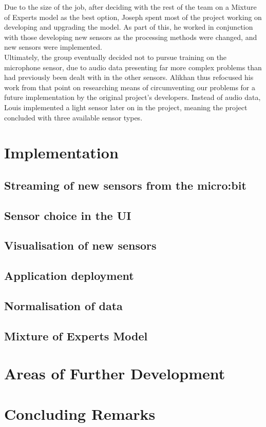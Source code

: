 \documentclass{article}
\begin{document}
Due to the size of the job, after deciding with the rest of the team on a Mixture of Experts model as the best option, Joseph spent most of the project working on developing and upgrading the model. As part of this, he worked in conjunction with those developing new sensors as the processing methods were changed, and new sensors were implemented. \\

Ultimately, the group eventually decided not to pursue training on the microphone sensor, due to audio data presenting far more complex problems than had previously been dealt with in the other sensors. Alikhan thus refocused his work from that point on researching means of circumventing our problems for a future implementation by the original project's developers. Instead of audio data, Louis implemented a light sensor later on in the project, meaning the project concluded with three available sensor types.

\section{Implementation}%
\label{sec:implementation}

\subsection{Streaming of new sensors from the micro:bit}%
\label{subsec:label}

\subsection{Sensor choice in the UI}%
\label{subsec:label}


\subsection{Visualisation of new sensors}%
\label{subsec:sensorvis}

\subsection{Application deployment}%
\label{subsec:deployment}

\subsection{Normalisation of data}%
\label{subsec:datanorm}

\subsection{Mixture of Experts Model}%
\label{subsec:moe}

\section{Areas of Further Development}%
\label{sec:development}

\section{Concluding Remarks}%
\label{sec:conclusion}
\end{document}
